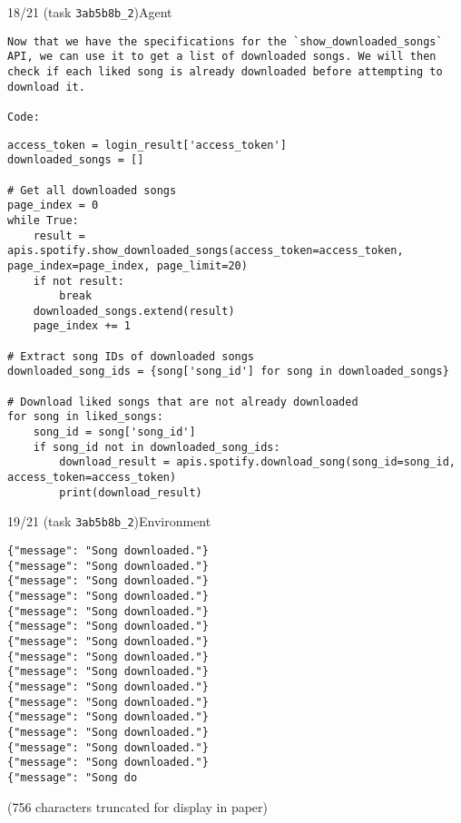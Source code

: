 \begin{minipage}{0.95\linewidth}
\begin{assistant_message_box}{{18/21 (task \texttt{3ab5b8b\_2})\hfill Agent}}
\scriptsize
\begin{Verbatim}[breaklines]
Now that we have the specifications for the `show_downloaded_songs` API, we can use it to get a list of downloaded songs. We will then check if each liked song is already downloaded before attempting to download it.

Code:
\end{Verbatim}
\begin{tcolorbox}[colback=codebgcolor,boxrule=0pt]\begin{Verbatim}[breaklines]
access_token = login_result['access_token']
downloaded_songs = []

# Get all downloaded songs
page_index = 0
while True:
    result = apis.spotify.show_downloaded_songs(access_token=access_token, page_index=page_index, page_limit=20)
    if not result:
        break
    downloaded_songs.extend(result)
    page_index += 1

# Extract song IDs of downloaded songs
downloaded_song_ids = {song['song_id'] for song in downloaded_songs}

# Download liked songs that are not already downloaded
for song in liked_songs:
    song_id = song['song_id']
    if song_id not in downloaded_song_ids:
        download_result = apis.spotify.download_song(song_id=song_id, access_token=access_token)
        print(download_result)
\end{Verbatim}
\end{tcolorbox}\end{assistant_message_box}
\end{minipage}

\hspace*{8mm}%
\begin{minipage}{0.95\linewidth}
\begin{user_message_box}{{19/21 (task \texttt{3ab5b8b\_2})\hfill Environment}}
\scriptsize
\begin{Verbatim}[breaklines]
{"message": "Song downloaded."}
{"message": "Song downloaded."}
{"message": "Song downloaded."}
{"message": "Song downloaded."}
{"message": "Song downloaded."}
{"message": "Song downloaded."}
{"message": "Song downloaded."}
{"message": "Song downloaded."}
{"message": "Song downloaded."}
{"message": "Song downloaded."}
{"message": "Song downloaded."}
{"message": "Song downloaded."}
{"message": "Song downloaded."}
{"message": "Song downloaded."}
{"message": "Song downloaded."}
{"message": "Song do
\end{Verbatim}
(756 characters truncated for display in paper)\end{user_message_box}
\end{minipage}

